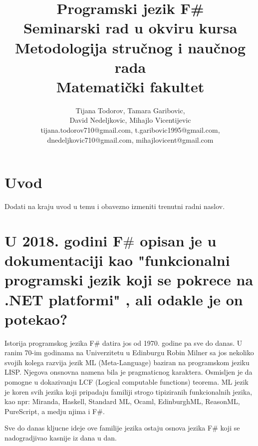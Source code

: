 \documentclass[a4paper]{article}
\begin{document}
\title{Programski jezik F\#\\ \small{Seminarski rad u okviru kursa\\Metodologija stručnog i naučnog rada\\ Matematički fakultet}}

\author{Tijana Todorov, Tamara Garibovic,\\ David Nedeljkovic, Mihajlo Vicentijevic \\ tijana.todorov710@gmail.com, t.garibovic1995@gmail.com, \\ dnedeljkovic710@gmail.com, mihajlovicent@gmail.com}


\maketitle


\tableofcontents

\newpage

\section{Uvod}
\label{sec:uvod}

Dodati na kraju uvod u temu i obavezno izmeniti trenutni radni naslov.

\section{U 2018. godini F$\#$ opisan je u dokumentaciji kao "funkcionalni programski jezik koji se pokrece na .NET platformi" \cite{early_history}, ali odakle je on potekao?}
\label{sec:poreklo}

Istorija programskog jezika F\# datira jos od 1970. godine pa sve do danas. U ranim 70-im godinama na Univerzitetu u Edinburgu Robin Milner sa jos nekoliko svojih kolega razvija jezik ML (Meta-Language) baziran na programskom jeziku LISP. Njegova onsnovna namena bila je pragmaticnog karaktera. Osmisljen je da pomogne u dokazivanju LCF (Logical computable functions) \cite{Milner:1972:LCF:891954} teorema. ML jezik je koren svih jezika koji pripadaju familiji strogo tipiziranih funkcionalnih jezika, kao npr: Miranda, Haskell, Standard ML, Ocaml, EdinburghML, ReasonML, PureScript, a medju njima i F\#.

Sve do danas kljucne ideje ove familije jezika ostaju osnova jezika F\# koji se nadogradjivao kasnije iz dana u dan. 
\end{document}
